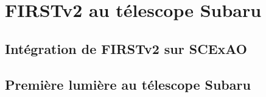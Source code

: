 \clearpage
\section{FIRSTv2 au télescope Subaru}
\label{sec:FIRSTv2Subaru}
\setcounter{figure}{0}
\setcounter{table}{0}

\subsection{Intégration de FIRSTv2 sur SCExAO}

\subsection{Première lumière au télescope Subaru}


